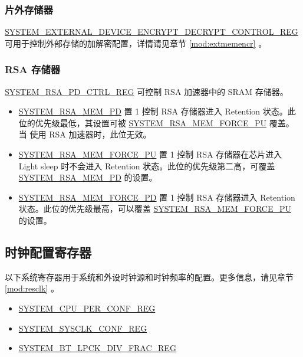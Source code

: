 \documentclass[main\_\_CN.tex]{subfiles}
\begin{document}
\subsubsection{片外存储器}

\hyperref[regdesc:SYSTEMEXTERNALDEVICEENCRYPTDECRYPTCONTROLREG]{SYSTEM\_EXTERNAL\_DEVICE\_ENCRYPT\_DECRYPT\_CONTROL\_REG} 可用于控制外部存储的加解密配置，详情请见章节 \ref{mod:extmemencr}
\textit{}。

\subsubsection{RSA 存储器}

\hyperref[regdesc:SYSTEMRSAPDCTRLREG]{SYSTEM\_RSA\_PD\_CTRL\_REG} 可控制 RSA 加速器中的 SRAM 存储器。

\begin{itemize}
    \item \hyperref[fielddesc:SYSTEMRSAMEMPD]{SYSTEM\_RSA\_MEM\_PD} 置 1 控制 RSA 存储器进入 Retention 状态。此位的优先级最低，其设置可被 \hyperref[fielddesc:SYSTEMRSAMEMFORCEPU]{SYSTEM\_RSA\_MEM\_FORCE\_PU} 覆盖。当 \textit{} 使用 RSA 加速器时，此位无效。
    \item \hyperref[fielddesc:SYSTEMRSAMEMFORCEPU]{SYSTEM\_RSA\_MEM\_FORCE\_PU} 置 1 控制 RSA 存储器在芯片进入 Light sleep 时不会进入 Retention 状态。此位的优先级第二高，可覆盖 \hyperref[fielddesc:SYSTEMRSAMEMPD]{SYSTEM\_RSA\_MEM\_PD} 的设置。
    \item \hyperref[fielddesc:SYSTEMRSAMEMFORCEPD]{SYSTEM\_RSA\_MEM\_FORCE\_PD} 置 1 控制 RSA 存储器进入 Retention 状态。此位的优先级最高，可以覆盖 \hyperref[fielddesc:SYSTEMRSAMEMFORCEPU]{SYSTEM\_RSA\_MEM\_FORCE\_PU} 的设置。
\end{itemize}


\subsection{时钟配置寄存器}

以下系统寄存器用于系统和外设时钟源和时钟频率的配置。更多信息，请见章节 \ref{mod:resclk}
\textit{}。

\begin{itemize}
    \item \hyperref[regdesc:SYSTEMCPUPERCONFREG]{SYSTEM\_CPU\_PER\_CONF\_REG}
    \item \hyperref[regdesc:SYSTEMSYSCLKCONFREG]{SYSTEM\_SYSCLK\_CONF\_REG}
    \item \hyperref[regdesc:SYSTEMBTLPCKDIVFRACREG]{SYSTEM\_BT\_LPCK\_DIV\_FRAC\_REG}
\end{itemize}
\end{document}
